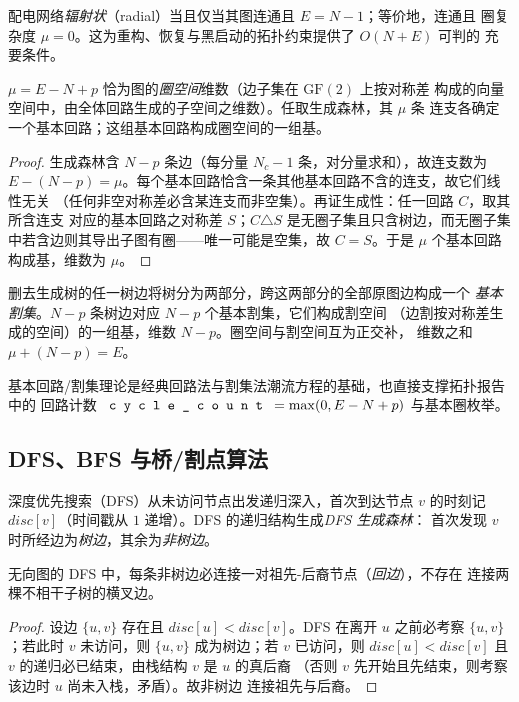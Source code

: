 \begin{corollary}[辐射性的代数判据]\label{sec:gr-th-radial}
配电网络\emph{辐射状}（radial）当且仅当其图连通且 $E=N-1$；等价地，连通且
圈复杂度 $\mu=0$。这为重构、恢复与黑启动的拓扑约束提供了 $O(N+E)$ 可判的
充要条件。
\end{corollary}

\begin{theorem}[圈空间维数与基本回路基]\label{sec:gr-th-cyclebasis}
$\mu=E-N+p$ 恰为图的\emph{圈空间}维数（边子集在 $\mathrm{GF}(2)$ 上按对称差
构成的向量空间中，由全体回路生成的子空间之维数）。任取生成森林，其 $\mu$ 条
连支各确定一个基本回路；这组基本回路构成圈空间的一组基。
\end{theorem}
\begin{proof}
生成森林含 $N-p$ 条边（每分量 $N_c-1$ 条，对分量求和），故连支数为
$E-(N-p)=\mu$。每个基本回路恰含一条其他基本回路不含的连支，故它们线性无关
（任何非空对称差必含某连支而非空集）。再证生成性：任一回路 $C$，取其所含连支
对应的基本回路之对称差 $S$；$C\triangle S$ 是无圈子集且只含树边，而无圈子集
中若含边则其导出子图有圈——唯一可能是空集，故 $C=S$。于是 $\mu$ 个基本回路
构成基，维数为 $\mu$。
\end{proof}

\begin{definition}[基本割集]
删去生成树的任一树边将树分为两部分，跨这两部分的全部原图边构成一个
\emph{基本割集}。$N-p$ 条树边对应 $N-p$ 个基本割集，它们构成割空间
（边割按对称差生成的空间）的一组基，维数 $N-p$。圈空间与割空间互为正交补，
维数之和 $\mu+(N-p)=E$。
\end{definition}

\begin{remark}
基本回路/割集理论是经典回路法与割集法潮流方程的基础，也直接支撑拓扑报告中的
回路计数 $\fld{cycle\_count}=\max(0,E-N+p)$ 与基本圈枚举。
\end{remark}

\subsection{DFS、BFS 与桥/割点算法}\label{sec:gr-th-dfs}

\begin{definition}
深度优先搜索（DFS）从未访问节点出发递归深入，首次到达节点 $v$ 的时刻记
$disc[v]$（时间戳从 $1$ 递增）。DFS 的递归结构生成\emph{DFS 生成森林}：
首次发现 $v$ 时所经边为\emph{树边}，其余为\emph{非树边}。
\end{definition}

\begin{lemma}[无向图无横叉边]\label{sec:gr-th-nocross}
无向图的 DFS 中，每条非树边必连接一对祖先-后裔节点（\emph{回边}），不存在
连接两棵不相干子树的横叉边。
\end{lemma}
\begin{proof}
设边 $\{u,v\}$ 存在且 $disc[u]<disc[v]$。DFS 在离开 $u$ 之前必考察
$\{u,v\}$；若此时 $v$ 未访问，则 $\{u,v\}$ 成为树边；若 $v$ 已访问，则
$disc[u]<disc[v]$ 且 $v$ 的递归必已结束，由栈结构 $v$ 是 $u$ 的真后裔
（否则 $v$ 先开始且先结束，则考察该边时 $u$ 尚未入栈，矛盾）。故非树边
连接祖先与后裔。
\end{proof}

